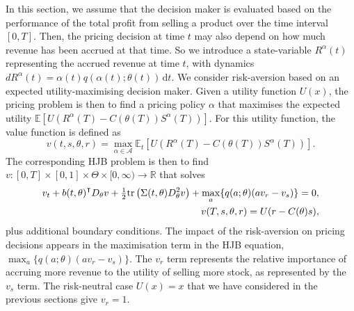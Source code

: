\documentclass[main.tex]{subfiles}
\begin{document}
In this section, we assume that the decision maker is evaluated based on
the performance of the total profit from selling a product over the
time interval $[0,T]$. Then, the pricing decision at time $t$ may also depend
on how much revenue has been accrued at that time. So we
introduce a state-variable $R^\alpha(t)$ representing the accrued
revenue at time $t$, with dynamics
$dR^\alpha(t)=\alpha(t)q(\alpha(t);\theta(t))\,\mathrm{d}t$.
We consider risk-aversion based on
an expected utility-maximising decision maker.
Given a utility function $U(x)$, the pricing problem is then to
find a pricing policy $\alpha$ that maximises the expected utility
$\mathbb{E}[U(R^\alpha(T)-C(\theta(T))S^\alpha(T))]$.
For this utility function, the value function is defined as
\begin{equation}
  v(t,s,\theta,r)=
  \max_{\alpha\in\mathcal{A}}
  \mathbb{E}_t\left[
    U\left(R^\alpha(T)-C(\theta(T))S^\alpha(T)\right)
  \right].
\end{equation}
The corresponding HJB problem is then to find
$v:{[0,T]}\times{[0,1]}\times \Theta\times{[0,\infty)}\to\mathbb{R}$ that solves
\begin{align}\label{eq:hjb_utility}
  v_t+{b(t,\theta)}^\intercal D_\theta v
  + {\textstyle\frac{1}{2}}\mbox{tr}\left( \Sigma(t,\theta)
  D_\theta^2v \right)
  +\max_{a}\{q(a;\theta)(av_r-v_s)\}=0&,\\
  v(T,s,\theta,r) = U(r-C(\theta)s)&,
\end{align}
plus additional boundary conditions. The impact of the risk-aversion
on pricing decisions appears in the maximisation term in the HJB
equation, $\max_a\{q(a;\theta)(av_r-v_s)\}$. The $v_r$ term represents
the relative importance of accruing more revenue to the utility of
selling more stock, as represented by the $v_s$ term.
The risk-neutral case $U(x)=x$ that we have considered in the previous
sections give $v_r=1$.
\end{document}
